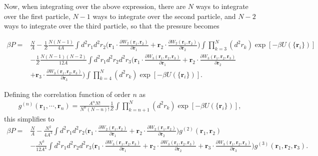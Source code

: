 \documentclass[twocolumn,amsmath,amssymb,aps]{revtex4-1}%
\begin{document}
Now, when integrating over the above expression, there are $N$ ways to
integrate over the first particle, $N-1$ ways to integrate over the
second particle, and $N-2$ ways to integrate over the third particle,
so that the pressure becomes
\begin{widetext}
  \begin{align}
    \beta P
    =& \frac{N}{A}
    -\frac{1}{Z}\frac{N(N-1)}{4A}\int d^2r_1d^2r_2\bigg(\bm{r}_1\cdot
    \frac{\partial W_2(\bm{r}_1,\bm{r}_2)}{\partial \bm{r}_1}
    +\bm{r}_2\cdot
    \frac{\partial W_2(\bm{r}_1,\bm{r}_2)}{\partial \bm{r}_2}\bigg)
    \int\prod_{k=3}^N(d^2r_k)
    \exp[-\beta U(\{\bm{r}_i\})]\nonumber\\
    &-\frac{1}{Z}\frac{N(N-1)(N-2)}{12A}\int d^2r_1d^2r_2d^2r_3\bigg(
    \bm{r}_1\cdot
    \frac{\partial W_3(\bm{r}_1,\bm{r}_2,\bm{r}_3)}{\partial \bm{r}_1}
    +\bm{r}_2\cdot
    \frac{\partial W_3(\bm{r}_1,\bm{r}_2,\bm{r}_3)}{\partial \bm{r}_2}
    \nonumber\\
    &+\bm{r}_3\cdot
    \frac{\partial W_3(\bm{r}_1,\bm{r}_2,\bm{r}_3)}{\partial \bm{r}_3}
    \bigg)
    \int\prod_{k=4}^N(d^2r_k)
    \exp[-\beta U(\{\bm{r}_i\})].
  \end{align}

  Defining the correlation function of order $n$ as
  \begin{align}
    g^{(n)}(\bm{r}_1,\cdots,\bm{r}_n)=\frac{A^nN!}{N^n(N-n)!}
    \frac{1}{Z}\int\prod_{k=n+1}^N(d^2r_k)
    \exp[-\beta U(\{\bm{r}_i\})],
  \end{align}
  this simplifies to
  \begin{align}
    \beta P
    =& \frac{N}{A}
    -\frac{N^2}{4A^3}\int d^2r_1d^2r_2\bigg(\bm{r}_1\cdot
    \frac{\partial W_2(\bm{r}_1,\bm{r}_2)}{\partial \bm{r}_1}
    +\bm{r}_2\cdot
    \frac{\partial W_2(\bm{r}_1,\bm{r}_2)}{\partial \bm{r}_2}\bigg)
    g^{(2)}(\bm{r}_1,\bm{r}_2)\nonumber\\
    &-\frac{N^3}{12A^4}\int d^2r_1d^2r_2d^2r_3\bigg(
    \bm{r}_1\cdot
    \frac{\partial W_3(\bm{r}_1,\bm{r}_2,\bm{r}_3)}{\partial \bm{r}_1}
    +\bm{r}_2\cdot
    \frac{\partial W_3(\bm{r}_1,\bm{r}_2,\bm{r}_3)}{\partial \bm{r}_2}
    +\bm{r}_3\cdot
    \frac{\partial W_3(\bm{r}_1,\bm{r}_2,\bm{r}_3)}{\partial \bm{r}_3}
    \bigg)g^{(3)}(\bm{r}_1,\bm{r}_2,\bm{r}_3).
  \end{align}
\end{widetext}
\end{document}
